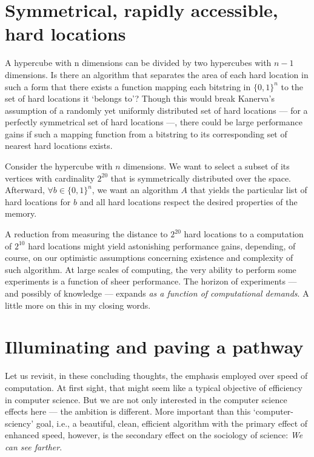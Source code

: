 \section{Symmetrical, rapidly accessible, hard locations}

A hypercube with n dimensions can be divided by two hypercubes with $n-1$ dimensions. Is there an algorithm that separates the area of each hard location in such a form that there exists a function mapping each bitstring in $\{0,1\}^n$ to the set of hard locations it `belongs to'?  Though this would break Kanerva's assumption of a randomly yet uniformly distributed set of hard locations --- for a perfectly symmetrical set of hard locations ---, there could be large performance gains if such a mapping function from a bitstring to its corresponding set of nearest hard locations exists.

Consider the hypercube with $n$ dimensions.  We want to select a subset of its vertices with cardinality $2^{20}$ that is symmetrically distributed over the space. Afterward, $\forall b \in \{ 0,1\} ^n$, we want an algorithm $A$ that yields the particular list of hard locations for $b$ and all hard locations respect the desired properties of the memory.

A reduction from measuring the distance to $2^{20}$ hard locations to a computation of $2^{10}$ hard locations might yield astonishing performance gains, depending, of course, on our optimistic assumptions concerning existence and complexity of such algorithm.  At large scales of computing, the very ability to perform some experiments is a function of sheer performance. The horizon of experiments --- and possibly of knowledge --- expands \emph{as a function of computational demands}. A little more on this in my closing words.



\section{Illuminating and paving a pathway}

Let us revisit, in these concluding thoughts, the emphasis employed over speed of computation.  At first sight, that might seem like a typical objective of efficiency in computer science. But we are not only interested in the computer science effects here --- the ambition is different. More important than this `computer-sciency' goal, i.e., a beautiful, clean, efficient algorithm with the primary effect of enhanced speed, however, is the secondary effect on the sociology of science:  \emph{We can see farther}.


